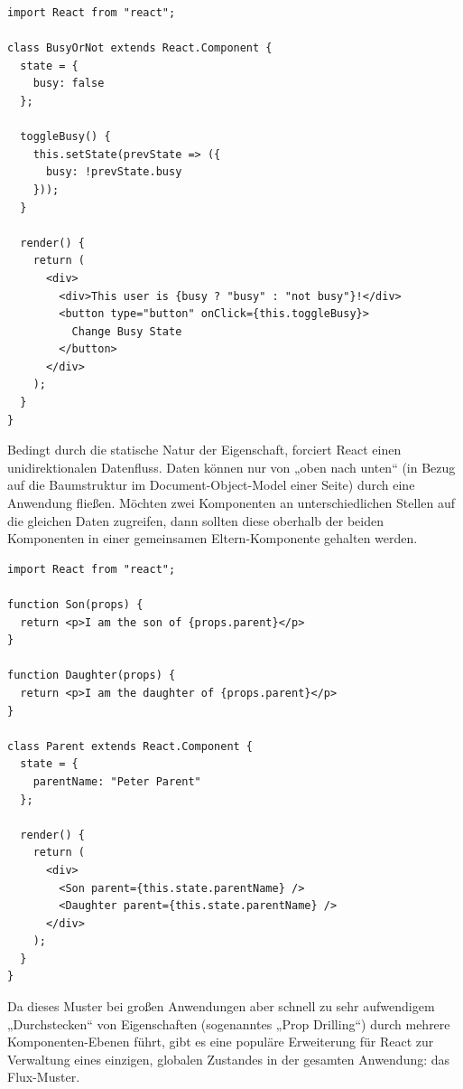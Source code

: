 \begin{minipage}{\linewidth}
\begin{lstlisting}[caption={Jede Komponente kann über einen modifizierbaren Zustand verfügen.}]
import React from "react";

class BusyOrNot extends React.Component {
  state = {
    busy: false
  };

  toggleBusy() {
    this.setState(prevState => ({
      busy: !prevState.busy
    }));
  }

  render() {
    return (
      <div>
        <div>This user is {busy ? "busy" : "not busy"}!</div>
        <button type="button" onClick={this.toggleBusy}>
          Change Busy State
        </button>
      </div>
    );
  }
}
\end{lstlisting}
\end{minipage}

Bedingt durch die statische Natur der Eigenschaft, forciert React einen unidirektionalen Datenfluss. Daten können nur von „oben nach unten“ (in Bezug auf die Baumstruktur im Document-Object-Model einer Seite) durch eine Anwendung fließen. Möchten zwei Komponenten an unterschiedlichen Stellen auf die gleichen Daten zugreifen, dann sollten diese oberhalb der beiden Komponenten in einer gemeinsamen Eltern-Komponente gehalten werden.\newline

\begin{minipage}{\linewidth}
\begin{lstlisting}[label={code:functionalcomponents},caption={„Lifting state up“: Mehrere Komponenten greifen auf die gleichen Daten zu.}]
import React from "react";

function Son(props) {
  return <p>I am the son of {props.parent}</p>
}

function Daughter(props) {
  return <p>I am the daughter of {props.parent}</p>
}

class Parent extends React.Component {
  state = {
    parentName: "Peter Parent"
  };

  render() {
    return (
      <div>
        <Son parent={this.state.parentName} />
        <Daughter parent={this.state.parentName} />
      </div>
    );
  }
}
\end{lstlisting}
\end{minipage}

Da dieses Muster bei großen Anwendungen aber schnell zu sehr aufwendigem „Durchstecken“ von Eigenschaften (sogenanntes „Prop Drilling“) durch mehrere Komponenten-Ebenen führt, gibt es eine populäre Erweiterung für React zur Verwaltung eines einzigen, globalen Zustandes in der gesamten Anwendung: das Flux-Muster.



